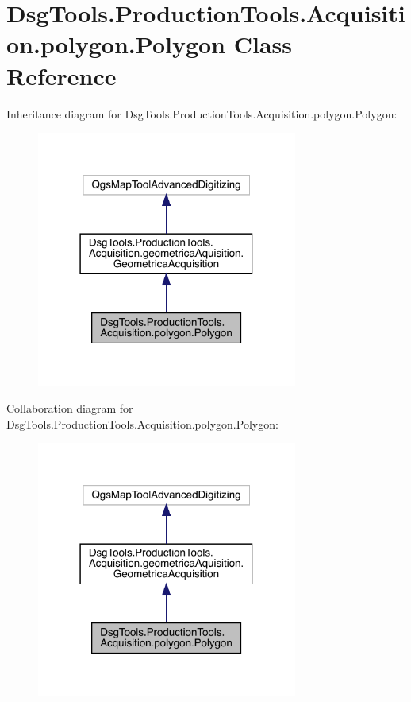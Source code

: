 \hypertarget{class_dsg_tools_1_1_production_tools_1_1_acquisition_1_1polygon_1_1_polygon}{}\section{Dsg\+Tools.\+Production\+Tools.\+Acquisition.\+polygon.\+Polygon Class Reference}
\label{class_dsg_tools_1_1_production_tools_1_1_acquisition_1_1polygon_1_1_polygon}


Inheritance diagram for Dsg\+Tools.\+Production\+Tools.\+Acquisition.\+polygon.\+Polygon\+:
\nopagebreak
\begin{figure}[H]
\begin{center}
\leavevmode
\includegraphics[width=243pt]{class_dsg_tools_1_1_production_tools_1_1_acquisition_1_1polygon_1_1_polygon__inherit__graph}
\end{center}
\end{figure}


Collaboration diagram for Dsg\+Tools.\+Production\+Tools.\+Acquisition.\+polygon.\+Polygon\+:
\nopagebreak
\begin{figure}[H]
\begin{center}
\leavevmode
\includegraphics[width=243pt]{class_dsg_tools_1_1_production_tools_1_1_acquisition_1_1polygon_1_1_polygon__coll__graph}
\end{center}
\end{figure}

